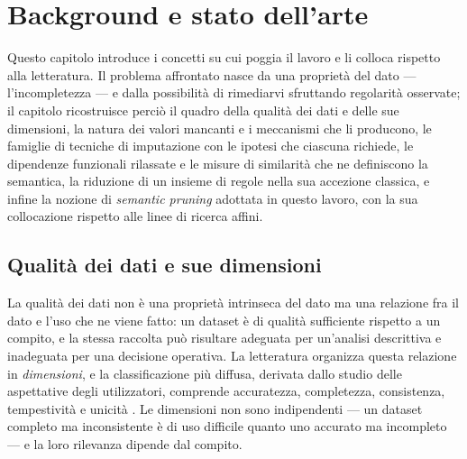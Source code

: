 \chapter{Background e stato dell'arte}\label{chap:background}


\noindent Questo capitolo introduce i concetti su cui poggia il lavoro e li colloca rispetto alla
letteratura. Il problema affrontato nasce da una proprietà del dato --- l'incompletezza --- e dalla
possibilità di rimediarvi sfruttando regolarità osservate; il capitolo ricostruisce perciò il
quadro della qualità dei dati e delle sue dimensioni, la natura dei valori mancanti e i meccanismi
che li producono, le famiglie di tecniche di imputazione con le ipotesi che ciascuna richiede, le
dipendenze funzionali rilassate e le misure di similarità che ne definiscono la semantica, la
riduzione di un insieme di regole nella sua accezione classica, e infine la nozione di
\emph{semantic pruning} adottata in questo lavoro, con la sua collocazione rispetto alle linee di
ricerca affini.

\section{Qualità dei dati e sue dimensioni}\label{sec:dq}

La qualità dei dati non è una proprietà intrinseca del dato ma una relazione fra il dato e l'uso
che ne viene fatto: un dataset è di qualità sufficiente rispetto a un compito, e la stessa
raccolta può risultare adeguata per un'analisi descrittiva e inadeguata per una decisione
operativa. La letteratura organizza questa relazione in \emph{dimensioni}, e la classificazione
più diffusa, derivata dallo studio delle aspettative degli utilizzatori, comprende accuratezza,
completezza, consistenza, tempestività e unicità \cite{wang1996beyond}. Le dimensioni non sono
indipendenti --- un dataset completo ma inconsistente è di uso difficile quanto uno accurato ma
incompleto --- e la loro rilevanza dipende dal compito.

